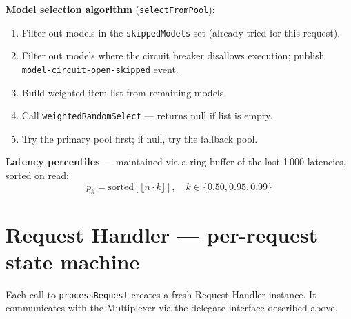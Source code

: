 \documentclass[10pt,letterpaper]{article}
\newcommand{\fn}[1]{\texttt{#1}}
\newcommand{\fld}[1]{\texttt{#1}}
\begin{document}
\medskip
\noindent\textbf{Model selection algorithm} (\fn{selectFromPool}):
\begin{enumerate}[nosep]
  \item Filter out models in the \fld{skippedModels} set (already tried for this request).
  \item Filter out models where the circuit breaker disallows execution; publish \texttt{model-circuit-open-skipped} event.
  \item Build weighted item list from remaining models.
  \item Call \fn{weightedRandomSelect} --- returns null if list is empty.
  \item Try the primary pool first; if null, try the fallback pool.
\end{enumerate}

\medskip
\noindent\textbf{Latency percentiles} --- maintained via a ring buffer of the last 1\,000 latencies, sorted on read:
$$p_k = \text{sorted}[\lfloor n \cdot k \rfloor], \quad k \in \{0.50, 0.95, 0.99\}$$

\section*{{\color{coreblue}Request Handler} \normalfont\small--- per-request state machine}

Each call to \fn{processRequest} creates a fresh Request Handler instance. It communicates with the Multiplexer via the delegate interface described above.
\end{document}
